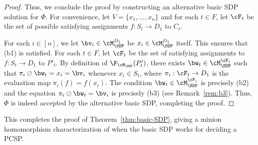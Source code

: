 \begin{proof}
{Thus, we conclude the proof by constructing an alternative basic SDP solution for $\Phi$. For convenience, let $V = \{x_1, \hdots, x_n\}$ and for each $t \in F$, let $\cF_t$ be the set of possible satisfying assignments $f : S_t \to D_1$ to $C_t$.

For each $i \in [n]$, we let $\bv_i \in \cM_{\SDP}^{D_1}$ be $x_i \in \cM_{\SDP}^{D_1}$ itself. This ensures that (b1) is satisfied. For each $t \in F$, let $\cF_t$ be the set of satisfying assignments to $f : S_t \to D_1$ to $P'_t$. By definition of $\F_{\cM_{\SDP}}(P'_t)$, there exists $\bw_t \in \cM_{\SDP}^{\cF_t}$ such that $\pi_i \oslash \bw_t = x_{i} = \bv_{i}$ whenever $x_i \in S_t$, where $\pi_i : \cF_t \to D_1$ is the evaluation map $\pi_i(f) = f(x_i)$. The condition $\bw_t \in \cM_{\SDP}^{\cF_j}$ is precisely (b2) and the equation $\pi_i \oslash \bw_t = \bv_i$ is precisely (b3) (see Remark~\ref{rem:b3}). Thus, $\Phi$ is indeed accepted by the alternative basic SDP, completing the proof.}
\end{proof}

This completes the proof of Theorem~\ref{thm:basic-SDP}, giving a minion homomorphism characterization of when the basic SDP works for deciding a PCSP.

